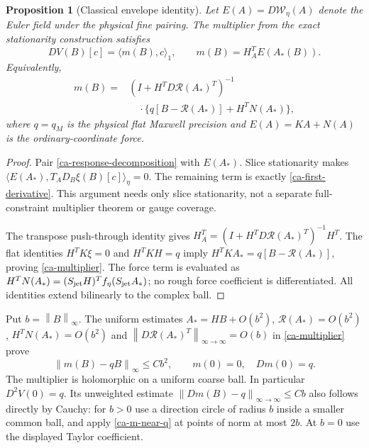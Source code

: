 \documentclass[11pt]{article}
\newtheorem{proposition}[theorem]{Proposition}
\theoremstyle{remark}
\newcommand{\norm}[1]{\left\|#1\right\|}
\begin{document}
\begin{proposition}[Classical envelope identity]\label{ca-envelope}
Let $E(A)=D\mathcal W_\eta(A)$ denote the Euler field under
the physical fine pairing. The multiplier from the exact
stationarity construction satisfies
\begin{equation}\label{ca-first-derivative}
 DV(B)[c]=\langle m(B),c\rangle_1,\qquad
 m(B)=H_A^TE(A_*(B)).
\end{equation}
Equivalently,
\begin{equation}\label{ca-multiplier}
 \begin{split}
 m(B)={}&(I+H^TD\mathcal R(A_*)^T)^{-1}\\
 &\quad\cdot\{q[B-\mathcal R(A_*)]+H^TN(A_*)\},
 \end{split}
\end{equation}
where $q=q_M$ is the physical flat Maxwell precision and
$E(A)=KA+N(A)$ is the ordinary-coordinate force.
\end{proposition}

\begin{proof}
Pair \eqref{ca-response-decomposition} with $E(A_*)$.
Slice stationarity makes
$\langle E(A_*),T_AD_B\xi(B)[c]\rangle_\eta=0$.
The remaining term is exactly \eqref{ca-first-derivative}.
This argument needs only slice stationarity, not a separate
full-constraint multiplier theorem or gauge coverage.

The transpose push-through identity gives
$H_A^T=(I+H^TD\mathcal R(A_*)^T)^{-1}H^T$.
The flat identities $H^TK\xi=0$ and $H^TKH=q$ imply
$H^TKA_*=q[B-\mathcal R(A_*)]$, proving
\eqref{ca-multiplier}. The force term is evaluated as
$H^TN(A_*)=(S_{\rm jet}H)^Tf_\eta(S_{\rm jet}A_*)$;
no rough force coefficient is differentiated. All identities
extend bilinearly to the complex ball.
\end{proof}

Put $b=\norm{B}_\infty$. The uniform estimates
$A_*=HB+O(b^2)$, $\mathcal R(A_*)=O(b^2)$,
$H^TN(A_*)=O(b^2)$ and
$\norm{D\mathcal R(A_*)^T}_{\infty\to\infty}=O(b)$
in \eqref{ca-multiplier} prove
\begin{equation}\label{ca-m-near-q}
 \norm{m(B)-qB}_\infty\le Cb^2,
 \qquad m(0)=0,\quad Dm(0)=q.
\end{equation}
The multiplier is holomorphic on a uniform coarse ball.
In particular $D^2V(0)=q$. Its unweighted estimate
$\norm{Dm(B)-q}_{\infty\to\infty}\le Cb$ also follows
directly by Cauchy: for $b>0$ use a direction circle of radius
$b$ inside a smaller common ball, and apply
\eqref{ca-m-near-q} at points of norm at most $2b$.
At $b=0$ use the displayed Taylor coefficient.
\end{document}
